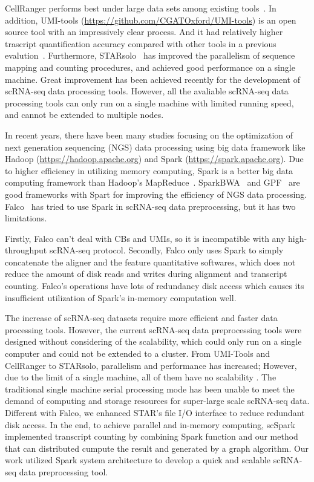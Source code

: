 \documentclass[conference]{IEEEtran}
\begin{document}
CellRanger performs best under large data sets among existing tools~\cite{Gao2020Comparison}.
In addition, UMI-tools (\url{https://github.com/CGATOxford/UMI-tools}) is an open source tool with an impressively clear process. And it had relatively higher trascript quantification accuracy compared with other tools in a previous evalution~\cite{Gao2020Comparison}. 
Furthermore, STARsolo~\cite{Blibaum2019STARsolo} has improved the parallelism of sequence mapping and counting procedures, and achieved good performance on a single machine.
Great improvement has been achieved recently for the development of scRNA-seq data processing tools. However, all the avaliable scRNA-seq data processing tools can only run on a single machine with limited running speed, and cannot be extended to multiple nodes.

In recent years, there have been many studies focusing on the optimization of next generation sequencing (NGS) data processing using big data framework like Hadoop (\url{https://hadoop.apache.org}) and Spark (\url{https://spark.apache.org}). 
Due to higher efficiency in utilizing memory computing, Spark is a better big data computing framework than Hadoop's MapReduce~\cite{Dean2008MapReduce, zaharia2010spark, Zaharia2012Resilient}. 
SparkBWA~\cite{Abun2016SparkBWA} and GPF~\cite{Li2018Highperformance} are good frameworks with Spart for improving the efficiency of NGS data processing. 
Falco~\cite{Yang2017Falco} has tried to use Spark in scRNA-seq data preprocessing, but it has two limitations. 

Firstly, Falco can't deal with CBs and UMIs, so it is incompatible with any high-throughput scRNA-seq protocol.
Secondly, Falco only uses Spark to simply concatenate the aligner and the feature quantitative softwares, which does not reduce the amount of disk reads and writes during alignment and transcript counting.
Falco’s operations have lots of redundancy disk access which causes its insufficient utilization of Spark’s in-memory computation well. 

The increase of scRNA-seq datasets require more efficient and faster data processing tools.
However, the current scRNA-seq data preprocessing tools were designed without considering of the scalability, which could only run on a single computer and could not be extended to a cluster. From UMI-Tools and CellRanger to STARsolo, parallelism and performance has increased; However, due to the limit of a single machine, all of them have no scalability . 
The traditional single machine serial processing mode has been unable to meet the demand of computing and storage resources for super-large scale scRNA-seq data.
Different with Falco, we enhanced STAR's file I/O interface to reduce redundant disk access.
In the end, to achieve parallel and in-memory computing, scSpark implemented transcript counting by combining Spark function and our method that can distributed cumpute the result and generated by a graph algorithm.
Our work utilized Spark system architecture to develop a quick and scalable scRNA-seq data preprocessing tool. 
\end{document}
